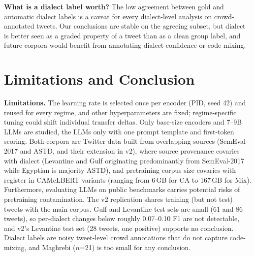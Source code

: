 \documentclass[11pt]{article}
\begin{document}
\textbf{What is a dialect label worth?} The low agreement between gold and automatic dialect labels is a caveat for every dialect-level analysis on crowd-annotated tweets. Our conclusions are stable on the agreeing subset, but dialect is better seen as a graded property of a tweet than as a clean group label, and future corpora would benefit from annotating dialect confidence or code-mixing.

\section{Limitations and Conclusion}
\label{sec:conclusion}
\textbf{Limitations.} The learning rate is selected once per encoder (PID, seed 42) and reused for every regime, and other hyperparameters are fixed; regime-specific tuning could shift individual transfer deltas. Only base-size encoders and 7--9B LLMs are studied, the LLMs only with one prompt template and first-token scoring. Both corpora are Twitter data built from overlapping sources (SemEval-2017 and ASTD, and their extension in v2), where source provenance covaries with dialect (Levantine and Gulf originating predominantly from SemEval-2017 while Egyptian is majority ASTD), and pretraining corpus size covaries with register in CAMeLBERT variants (ranging from 6\,GB for CA to 167\,GB for Mix). Furthermore, evaluating LLMs on public benchmarks carries potential risks of pretraining contamination. The v2 replication shares training (but not test) tweets with the main corpus. Gulf and Levantine test sets are small (61 and 86 tweets), so per-dialect changes below roughly 0.07--0.10 F1 are not detectable, and v2's Levantine test set (28 tweets, one positive) supports no conclusion. Dialect labels are noisy tweet-level crowd annotations that do not capture code-mixing, and Maghrebi ($n$=21) is too small for any conclusion.
\end{document}
